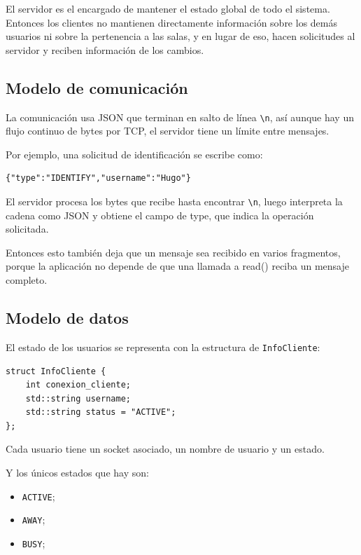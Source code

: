 \documentclass[12pt,letterpaper]{article}
\begin{document}
El servidor es el encargado de mantener el estado global de todo el
sistema. Entonces los clientes no mantienen directamente información sobre los demás
usuarios ni sobre la pertenencia a las salas, y en lugar de eso, hacen
solicitudes al servidor y reciben información de los cambios.

\subsection{Modelo de comunicación}

La comunicación usa JSON que terminan en salto de línea \texttt{\textbackslash n}, así aunque  hay un flujo
continuo de bytes por TCP, el servidor tiene un límite entre mensajes.

Por ejemplo, una solicitud de identificación se escribe como:
\begin{lstlisting}[style=jsonstyle]
{"type":"IDENTIFY","username":"Hugo"}
\end{lstlisting}

El servidor procesa los bytes que recibe hasta encontrar
\texttt{\textbackslash n}, luego interpreta la cadena como JSON y
obtiene el campo de type, que indica la operación solicitada.

Entonces esto también deja que un mensaje sea recibido en varios
fragmentos, porque la aplicación no depende de que una llamada a read() reciba un mensaje completo.

\subsection{Modelo de datos}

El estado de los usuarios se representa con la estructura de \texttt{InfoCliente}:

\begin{lstlisting}[style=cppstyle]
struct InfoCliente {
    int conexion_cliente;
    std::string username;
    std::string status = "ACTIVE";
};
\end{lstlisting}

Cada usuario tiene un socket asociado, un nombre de usuario y un estado.

Y los únicos estados que hay son: 

\begin{itemize}
    \item \texttt{ACTIVE};
    \item \texttt{AWAY};
    \item \texttt{BUSY};
\end{itemize}
\end{document}
